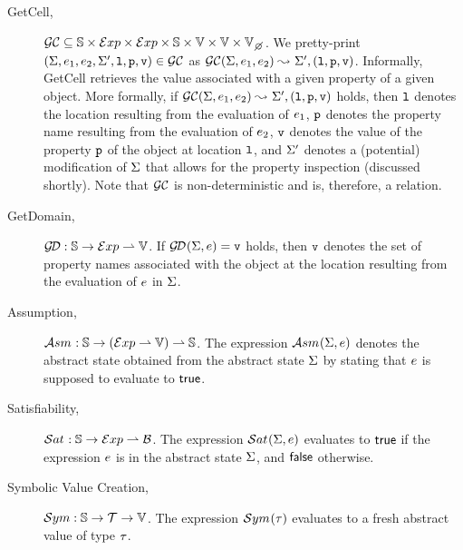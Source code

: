 \begin{description}
  
  \item[GetCell,] $\getcell \subseteq \absstates \times \exprs \times \exprs \times \absstates \times \absvals \times \absvals \times \setext{\absvals}{\none}$. 
          We pretty-print $(\Sigma, e_1, e_2, \Sigma', \mathtt{l}, \mathtt{p}, \mathtt{v}) \in \mathcal{GC}$ as $\mathcal{GC}(\Sigma, e_1, e_2) \leadsto_{} \Sigma', (\mathtt{l}, \mathtt{p}, \mathtt{v})$. 
          Informally, GetCell retrieves the value associated with a given property of a given object. More formally, if $\mathcal{GC}(\Sigma, e_1, e_2) \leadsto_{} \Sigma', (\mathtt{l}, \mathtt{p}, \mathtt{v})$ holds, 
          then  $\mathtt{l}$ denotes the location resulting from the evaluation of $e_1$, 
           $\mathtt{p}$ denotes the property name resulting from the evaluation of $e_2$, 
           $\mathtt{v}$ denotes the value of the property $\mathtt{p}$ of the object at location $\mathtt{l}$, 
          and  $\Sigma'$ denotes a (potential) modification of $\Sigma$ that allows for the property inspection (discussed shortly). 
          Note that $\mathcal{GC}$ is non-deterministic and is, therefore, a relation.
             
  \item[GetDomain,] $\mathcal{G\!D} : \mathbb{S} \rightarrow \mathcal{E}xp \rightharpoonup \mathbb{V}$. 
           If $\mathcal{G\!D}_{}(\Sigma, e) = \mathtt{v}$ holds, then $\mathtt{v}$ denotes the 
           set of property names associated with the object at the location resulting from the evaluation of $e$ 
           in $\Sigma$. 
   
   \item[Assumption,] $\mathcal{A}{sm}_{} : \mathbb{S} \rightarrow (\mathcal{E}xp \rightharpoonup \mathbb{V}) \rightharpoonup \mathbb{S}$. 
            The expression $\mathcal{A}{sm}_{}(\Sigma, e)$ denotes the abstract state obtained from the 
            abstract state $\Sigma$ by stating that $e$ is supposed to evaluate to ${\sf true}$. 
  
   \item[Satisfiability,] $\mathcal{S}at_{} : \mathbb{S} \rightarrow \mathcal{E}xp \rightharpoonup \mathcal{B}$. 
            The expression $\mathcal{S}at_{}(\Sigma, e)$ evaluates to ${\sf true}$ if the \jsil expression $e$ is  in the abstract 
            state $\Sigma$, and ${\sf false}$ otherwise.
             
   \item[Symbolic Value Creation,] $\mathcal{S}ym : \mathbb{S} \rightarrow \mathcal{T} \rightarrow \mathbb{V}$. 
            The expression $\mathcal{S}ym_{}(\tau)$ evaluates to a fresh abstract value of type $\tau$.
\end{description}

